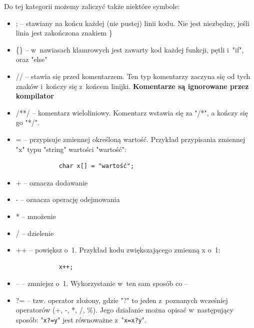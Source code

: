 \documentclass[a4paper,12pt, twoside]{article}
\begin{document}
	Do tej kategorii możemy zaliczyć także niektóre symbole:
	\begin{itemize}
		\item ; -- stawiany na końcu każdej (nie pustej) linii kodu. Nie jest niezbędny, jeśli linia jest zakończona znakiem \}
		\item \{\} -- w~nawiasach klamrowych jest zawarty kod każdej funkcji, pętli i~"if", oraz "else"
		\item // -- stawia się przed komentarzem. Ten typ komentarzy zaczyna się od tych znaków i~kończy się z~końcem linijki. \textbf{Komentarze są ignorowane przez kompilator} 
		\item /**/ -- komentarz wieloliniowy. Komentarz wstawia się za "/*", a kończy się go "*/".
		\item = -- przypisuje zmiennej określoną wartość. Przykład przypisania zmiennej "x" typu "string" wartości "wartość":
			\begin{verbatim}
			char x[] = "wartość";
			\end{verbatim}
		\item + -- oznacza dodawanie
		\item - -- oznacza operację odejmowania
		\item * -- mnożenie
		\item / -- dzielenie
		\item ++ -- powiększ o~1. Przykład kodu zwiększającego zmienną x o~1:
			\begin{verbatim}
			x++;
			\end{verbatim}
		\item -- -- zmniejsz o~1. Wykorzystanie w~ten sam sposób co --
		\item ?= -- tzw. operator złożony, gdzie "?" to jeden z~poznanych wcześniej operatorów (+, -, *, /, \%). Jego działanie można opisać w~następujący sposób: "\verb|x?=y|" jest równoważne z~"\verb|x=x?y|".
	\end{itemize}
\end{document}
